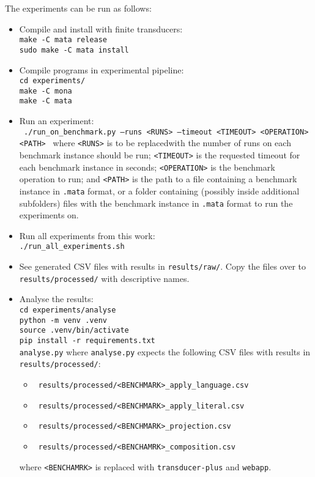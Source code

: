 The experiments can be run as follows:
\begin{itemize}
  \item Compile and install \mata with finite transducers:
  \\
  \texttt{make -C mata release}
  \\
  \texttt{sudo make -C mata install}

  \item Compile programs in experimental pipeline:
  \\
  \texttt{cd experiments/}
  \\
  \texttt{make -C mona}
  \\
  \texttt{make -C mata}

  \item Run an experiment:
  \\
  \texttt{
    ./run\_on\_benchmark.py --runs <RUNS> --timeout <TIMEOUT> <OPERATION> <PATH>
  }
  where \texttt{<RUNS>} is to be replacedwith the number of runs on each benchmark instance should be run; \texttt{<TIMEOUT>} is the requested timeout for each benchmark instance in seconds; \texttt{<OPERATION>} is the benchmark operation to run; and \texttt{<PATH>} is the path to a file containing a benchmark instance in \texttt{.mata} format, or a folder containing (possibly inside additional subfolders) files with the benchmark instance in \texttt{.mata} format to run the experiments on.

  \item Run all experiments from this work:
  \\
  \texttt{./run\_all\_experiments.sh}

  \item See generated CSV files with results in \texttt{results/raw/}. Copy the files over to \texttt{results/processed/} with descriptive names.

  \item Analyse the results:
  \\
  \texttt{cd experiments/analyse}
  \\
  \texttt{python -m venv .venv}
  \\
  \texttt{source .venv/bin/activate}
  \\
  \texttt{pip install -r requirements.txt}
  \\
  \texttt{analyse.py}
  where \texttt{analyse.py} expects the following CSV files with results in \texttt{results/processed/}:
  \begin{itemize}
    \item \texttt{
    results/processed/<BENCHMARK>\_apply\_language.csv
    }
    \item \texttt{
      results/processed/<BENCHMARK>\_apply\_literal.csv
    }

    \item \texttt{
results/processed/<BENCHMARK>\_projection.csv
    }

    \item \texttt{
results/processed/<BENCHAMRK>\_composition.csv
    }
  \end{itemize}
  where \texttt{<BENCHAMRK>} is replaced with \texttt{transducer-plus} and \texttt{webapp}.

\end{itemize}


